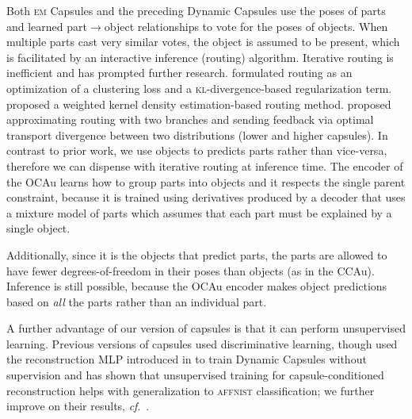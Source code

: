 Both \textsc{em} Capsules and the preceding Dynamic Capsules \citep{Sabour2017capsule} use the poses of parts and learned part$\rightarrow$object relationships to vote for the poses of objects. When multiple parts cast very similar votes, the object is assumed to be present, which is facilitated by an interactive inference (routing) algorithm. Iterative routing is inefficient and has prompted further research. \cite{Wang2018optimization} formulated routing as an optimization of a clustering loss and a \textsc{kl}-divergence-based regularization term.  \cite{Zhang2018fast} proposed a weighted kernel density estimation-based routing method. \cite{Encapsule} proposed approximating routing with two branches and sending feedback via optimal transport divergence between two distributions (lower and higher capsules). 
In contrast to prior work, we use objects to predicts parts rather than vice-versa, therefore we can dispense with iterative routing at inference time. The encoder of the \gls{OCAu} learns how to group parts into objects and it respects the single parent constraint, because it is trained using derivatives produced by a decoder that uses a mixture model of parts which assumes that each part must be explained by a single object. 

Additionally, since it is the objects that predict parts, the parts are allowed to have fewer degrees-of-freedom in their poses than objects (as in the \gls{CCAu}). 
Inference is still possible, because the \gls{OCAu} encoder makes object predictions based on {\it all} the parts rather than an individual part.

A further advantage of our version of capsules is that it can perform unsupervised learning. Previous versions of capsules used discriminative learning, though \cite{Sparsecaps} used the reconstruction \gls{MLP} introduced in \cite{Sabour2017capsule} to train Dynamic Capsules without supervision and has shown that unsupervised training for capsule-conditioned reconstruction helps with generalization to \textsc{affnist} classification; we further improve on their results, \textit{cf}.\ .

% 

